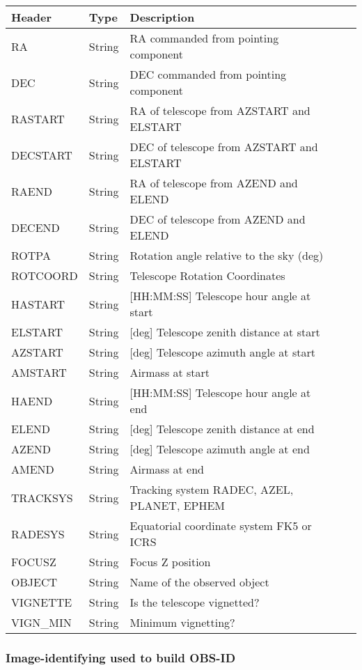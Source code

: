 \begin{tabular}{l l l l l}
\hline
Header & Type & Description \\
\hline
RA & String & RA commanded from pointing component \\
DEC & String & DEC commanded from pointing component \\
RASTART & String & RA of telescope from AZSTART and ELSTART \\
DECSTART & String & DEC of telescope from AZSTART and ELSTART \\
RAEND & String & RA of telescope from AZEND and ELEND \\
DECEND & String & DEC of telescope from AZEND and ELEND \\
ROTPA & String & Rotation angle relative to the sky (deg) \\
ROTCOORD & String & Telescope Rotation Coordinates \\
HASTART & String & [HH:MM:SS] Telescope hour angle at start \\
ELSTART & String & [deg] Telescope zenith distance at start \\
AZSTART & String & [deg] Telescope azimuth angle at start \\
AMSTART & String & Airmass at start \\
HAEND & String & [HH:MM:SS] Telescope hour angle at end \\
ELEND & String & [deg] Telescope zenith distance at end \\
AZEND & String & [deg] Telescope azimuth angle at end \\
AMEND & String & Airmass at end \\
TRACKSYS & String & Tracking system RADEC, AZEL, PLANET, EPHEM \\
RADESYS & String & Equatorial coordinate system FK5 or ICRS \\
FOCUSZ & String & Focus Z position \\
OBJECT & String & Name of the observed object \\
VIGNETTE & String & Is the telescope vignetted? \\
VIGN\_MIN & String & Minimum vignetting? \\
\hline
\end{tabular}


\subsubsection{Image-identifying used to build OBS-ID}


